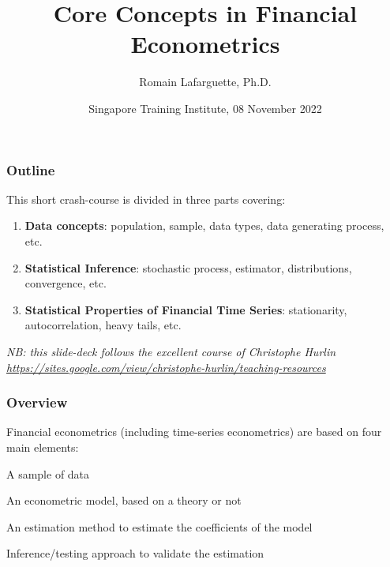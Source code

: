 \documentclass{beamer}
\title[Concepts]{Core Concepts in Financial Econometrics}
\author[R. Lafarguette]{Romain Lafarguette, Ph.D.}
\institute[IMF]{ADIA Quant \& IMF External Consultant}
\date[STI, 08 Nov 2022]{Singapore Training Institute, 08 November 2022}
\newenvironment{wideenumerate}{\enumerate\addtolength{\itemsep}{10pt}}{\endenumerate}
\begin{document}
\begingroup
\renewcommand{\insertframenumber}{}
\begin{frame}
\maketitle
\end{frame}
\endgroup


\begin{frame}
  \frametitle{Outline}

  This short crash-course is divided in three parts covering:\\
  \smallskip
  
  \begin{enumerate}
  \item \textbf{Data concepts}: population, sample, data types, data generating process, etc.
  \item \textbf{Statistical Inference}: stochastic process, estimator, distributions, convergence, etc.
  \item \textbf{Statistical Properties of Financial Time Series}: stationarity, autocorrelation, heavy tails, etc.
  \end{enumerate}


\smallskip
\emph{NB: this slide-deck follows the excellent course of Christophe Hurlin \url{https://sites.google.com/view/christophe-hurlin/teaching-resources}}  
\end{frame}




\begin{frame}
  \frametitle{Overview}

Financial econometrics (including time-series econometrics) are based on four main elements:\\
\smallskip

  \begin{wideenumerate}
    \item A sample of data
    \item An econometric model, based on a theory or not
    \item An estimation method to estimate the coefficients of the model
    \item Inference/testing approach to validate the estimation
  \end{wideenumerate}
  
\end{frame}
\end{document}
